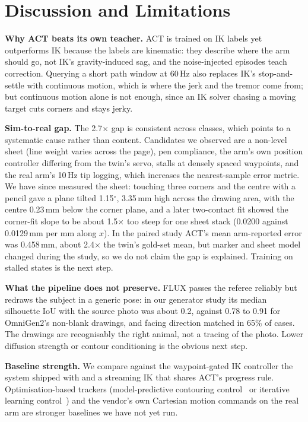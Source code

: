 \documentclass[conference]{IEEEtran}
\newcommand{\mm}{\,mm\xspace}
\begin{document}
\section{Discussion and Limitations}

\textbf{Why ACT beats its own teacher.} ACT is trained on IK labels yet outperforms IK because the labels are
kinematic: they describe where the arm should go, not IK's gravity-induced sag, and the noise-injected episodes
teach correction. Querying a short path window at 60\,Hz also replaces IK's stop-and-settle with continuous
motion, which is where the jerk and the tremor come from; but continuous motion alone is not enough, since an IK
solver chasing a moving target cuts corners and stays jerky.

\textbf{Sim-to-real gap.} The 2.7$\times$ gap is consistent across classes, which points to a systematic
cause rather than content. Candidates we observed are a non-level sheet (line weight varies across the page),
pen compliance, the arm's own position controller differing from the twin's servo, stalls at densely spaced waypoints, and the real arm's 10\,Hz tip logging, which increases the nearest-sample
error metric. We have since measured the sheet: touching three corners and the centre with a pencil gave a plane tilted
1.15$^\circ$, 3.35\mm high across the drawing area, with the centre 0.23\mm below the corner plane, and a later
two-contact fit showed the corner-fit slope to be about 1.5$\times$ too steep for one sheet stack (0.0200 against
0.0129\mm per mm along $x$). In the paired study ACT's mean arm-reported error was 0.458\mm, about 2.4$\times$ the
twin's gold-set mean, but marker and sheet model changed during the study, so we do not claim the gap is explained.
Training on stalled states is the next step.

\textbf{What the pipeline does not preserve.} FLUX passes the referee reliably but redraws the subject in a
generic pose: in our generator study its median silhouette IoU with the source photo was about 0.2, against
0.78 to 0.91 for OmniGen2's non-blank drawings, and facing direction matched in 65\% of cases. The drawings are
recognisably the right animal, not a tracing of the photo. Lower diffusion strength or contour conditioning is
the obvious next step.

\textbf{Baseline strength.} We compare against the waypoint-gated IK controller the system shipped with and a
streaming IK that shares ACT's progress rule. Optimisation-based trackers (model-predictive contouring
control~\cite{lam2010mpcc} or iterative learning control~\cite{bristow2006ilc}) and the vendor's own Cartesian
motion commands on the real arm are stronger baselines we have not yet run.
\end{document}
